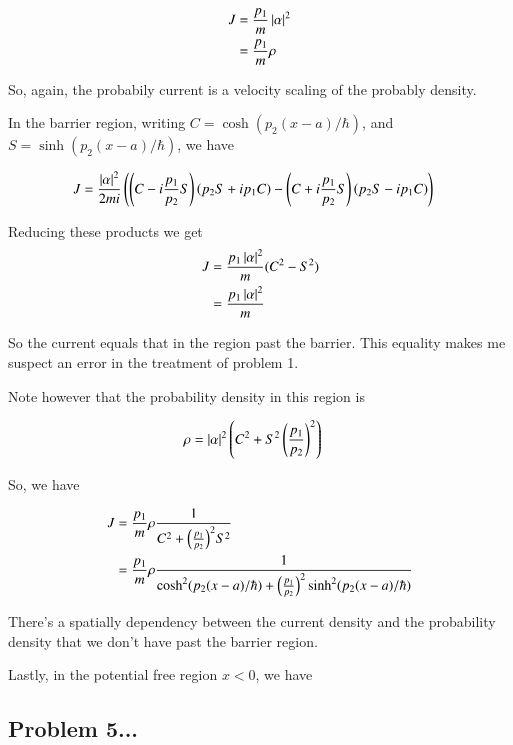 \documentclass{article}
\begin{document}
\begin{align*}
J 
&= \frac{p_1}{m} \left\lvert{\alpha}\right\rvert^2 \\
&= \frac{p_1}{m} \rho
\end{align*}

So, again, the probabily current is a velocity scaling of the probably density.

In the barrier region, writing 
$C = \cosh(p_2(x-a)/\hbar)$, and 
$S = \sinh(p_2(x-a)/\hbar)$, we have

\begin{align*}
J &= 
\frac{\left\lvert{\alpha}\right\rvert^2}{ 2 m i } 
\left(
\left(C - i \frac{p_1}{p_2}S\right)
\left(p_2 S + i p_1 C\right) 
-
\left(C + i \frac{p_1}{p_2}S\right)
\left(p_2 S - i p_1 C\right)
\right)
\end{align*}

Reducing these products we get
\begin{align*}
J 
&= 
\frac{p_1 \left\lvert{\alpha}\right\rvert^2}{m} (C^2 - S^2) \\
&= 
\frac{p_1 \left\lvert{\alpha}\right\rvert^2}{m} 
\end{align*}

So the current equals that in the region past the barrier.  This 
equality makes me suspect an error in the treatment of problem 1.

Note however
that the probability density in this region is

\begin{align*}
\rho 
&= \left\lvert{\alpha}\right\rvert^2 \left(
C^2 + S^2 \left(\frac{p_1}{p_2}\right)^2
\right)
\end{align*}

So, we have

\begin{align*}
J 
&= 
\frac{p_1}{m} \rho \frac{1}{C^2 + {\left(\frac{p_1}{p_2}\right)}^2 S^2 } \\
&= 
\frac{p_1}{m} \rho \frac{1}{
\cosh^2(p_2(x-a)/\hbar)
 + 
 {\left(\frac{p_1}{p_2}\right)}^2
\sinh^2(p_2(x-a)/\hbar)
 } \\
\end{align*}

There's a spatially dependency between the current density and the probability density that we don't have past the barrier region.

Lastly, in the potential free region $x<0$, we have

\subsection{ Problem 5... }



\end{document}
